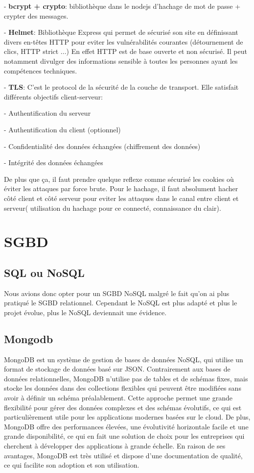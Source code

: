 \documentclass[a4paper,12pt]{report}
\begin{document}
- \textbf{bcrypt + crypto}: bibliothèque dans le nodejs d'hachage de mot de passe + crypter des messages.

- \textbf{Helmet}: Bibliothèque Express qui permet de sécurisé son site en définissant divers en-têtes HTTP pour eviter les vulnérabilités courantes (détournement de clics, HTTP strict ...)
En effet HTTP est de base ouverte et non sécurisé. Il peut notamment divulger des informations sensible à toutes les personnes ayant les compétences techniques.

- \textbf{TLS}: C'est le protocol de la sécurité de la couche de transport. 
Elle satisfait différents objectifs client-serveur:

- Authentification du serveur

- Authentification du client (optionnel)

- Confidentialité des données échangées (chiffrement des données)

- Intégrité des données échangées

De plus que ça, il faut prendre quelque reflexe comme sécurisé les cookies où éviter les attaques par force brute.
Pour le hachage, il faut absolument hacher côté client et côté serveur pour eviter les attaques dans le canal entre client et serveur( utilisation du hachage pour ce connecté, connaissance du clair).

\section{SGBD}
\subsection{SQL ou NoSQL}
Nous avions donc opter pour un SGBD NoSQL malgré le fait qu'on ai plus pratiqué le SGBD relationnel. Cependant le NoSQL est plus adapté et plus le projet évolue, plus le NoSQL deviennait une évidence.
\subsection{Mongodb}
MongoDB est un système de gestion de bases de données NoSQL, qui utilise un format de stockage de données basé sur JSON. Contrairement aux bases de données relationnelles, MongoDB n'utilise pas de tables et de schémas fixes, mais stocke les données dans des collections flexibles qui peuvent être modifiées sans avoir à définir un schéma préalablement.
Cette approche permet une grande flexibilité pour gérer des données complexes et des schémas évolutifs, ce qui est particulièrement utile pour les applications modernes basées sur le cloud. De plus, MongoDB offre des performances élevées, une évolutivité horizontale facile et une grande disponibilité, ce qui en fait une solution de choix pour les entreprises qui cherchent à développer des applications à grande échelle.
En raison de ses avantages, MongoDB est très utilisé et dispose d'une documentation de qualité, ce qui facilite son adoption et son utilisation.
\end{document}
